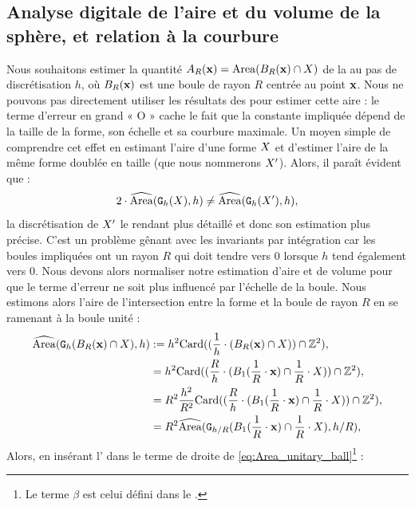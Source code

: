 \subsection{Analyse digitale de l'aire et du volume de la sphère, et relation à la courbure}
%
Nous souhaitons estimer la quantité $A_R(\vx) = \Area(\Ball{R}{\vx}\cap\Shape)$ de la
 au pas de discrétisation $h$, où $\Ball{R}{\vx}$ est une
boule de rayon $R$ centrée au point $\vx$. Nous ne pouvons pas directement
utiliser les résultats des
 pour estimer cette
aire : le terme d'erreur en grand « O » cache le fait que la constante impliquée
dépend de la taille de la forme, son échelle et sa courbure maximale. Un moyen
simple de comprendre cet effet en estimant l'aire d'une forme $\Shape$ et
d'estimer l'aire de la même forme doublée en taille (que nous nommerons
$\Shape'$). Alors, il paraît évident que :
%
\begin{equation}
  2 \cdot \AreaC(\DSh,h) \ne \AreaC(\DigF{\Shape'}{h},h),
\end{equation}
%
la discrétisation de $\Shape'$ le rendant plus détaillé et donc son estimation
plus précise. C'est un problème gênant avec les invariants par intégration car
les boules impliquées ont un rayon $R$ qui doit tendre vers $0$ lorsque $h$ tend
également vers $0$. Nous devons alors normaliser notre estimation d'aire et de
volume pour que le terme d'erreur ne soit plus influencé par l'échelle de la
boule. Nous estimons alors l'aire de l'intersection entre la forme et la boule
de rayon $R$ en se ramenant à la boule unité :
%
\begin{align}
  \AreaC(\DigF{\Ball{R}{\vx} \cap \Shape}{h}, h) & \EqDef h^2 \MCard( ( \frac{1}{h} \cdot ( \Ball{R}{\vx} \cap \Shape ) ) \cap \Z^2 ), \\
   & = h^2 \MCard( (\frac{R}{h} \cdot ( \Ball{1}{\frac{1}{R} \cdot \vx} \cap \frac{1}{R} \cdot \Shape) ) \cap \Z^2 ), \\
   & = R^2 \frac{h^2}{R^2} \MCard( (\frac{R}{h} \cdot ( \Ball{1}{\frac{1}{R} \cdot \vx} \cap \frac{1}{R} \cdot \Shape) ) \cap \Z^2 ), \\
   & = R^2 \AreaC( \DigF{\Ball{1}{\frac{1}{R} \cdot \vx} \cap \frac{1}{R} \cdot \Shape}{h/R}, h/R ), \label{eq:Area_unitary_ball}
\end{align}
%
Alors, en insérant l' dans le terme de droite
de \ref{eq:Area_unitary_ball}\footnote{Le terme $\beta$ est celui défini dans le .} :
